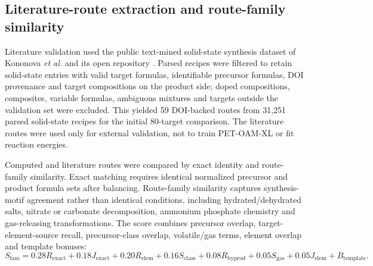 \documentclass[11pt, letterpaper]{article}
\begin{document}
\subsection*{Literature-route extraction and route-family similarity}

Literature validation used the public text-mined solid-state synthesis dataset of Kononova \textit{et al.} and its open repository \cite{kononova2019textmined,cedergrouphub_textmined_synthesis_public}. Parsed recipes were filtered to retain solid-state entries with valid target formulas, identifiable precursor formulas, DOI provenance and target compositions on the product side; doped compositions, composites, variable formulas, ambiguous mixtures and targets outside the validation set were excluded. This yielded 59 DOI-backed routes from 31,251 parsed solid-state recipes for the initial 80-target comparison. The literature routes were used only for external validation, not to train PET-OAM-XL or fit reaction energies.

Computed and literature routes were compared by exact identity and route-family similarity. Exact matching requires identical normalized precursor and product formula sets after balancing. Route-family similarity captures synthesis-motif agreement rather than identical conditions, including hydrated/dehydrated salts, nitrate or carbonate decomposition, ammonium phosphate chemistry and gas-releasing transformations. The score combines precursor overlap, target-element-source recall, precursor-class overlap, volatile/gas terms, element overlap and template bonuses:
\begin{equation}
S_{\mathrm{fam}}
=0.28R_{\mathrm{exact}}
+0.18J_{\mathrm{exact}}
+0.20R_{\mathrm{elem}}
+0.16S_{\mathrm{class}}
+0.08R_{\mathrm{byprod}}
+0.05S_{\mathrm{gas}}
+0.05J_{\mathrm{elem}}
+B_{\mathrm{template}} .
\end{equation}
\end{document}
